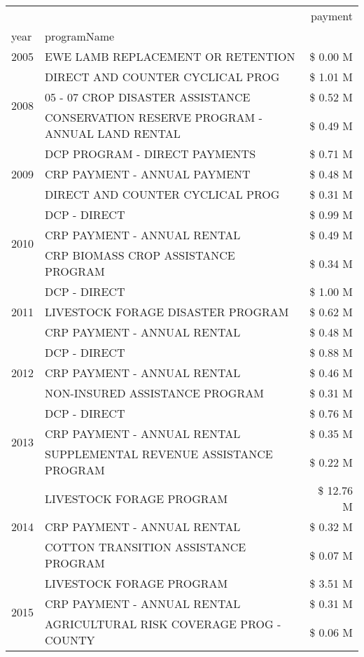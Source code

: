 \begin{tabular}{llr}
\toprule
 &  & payment \\
year & programName &  \\
\midrule
2005 & EWE LAMB REPLACEMENT OR RETENTION & \$ 0.00 M \\
\cline{1-3}
\multirow[t]{3}{*}{2008} & DIRECT AND COUNTER CYCLICAL PROG & \$ 1.01 M \\
 & 05 - 07 CROP DISASTER ASSISTANCE & \$ 0.52 M \\
 & CONSERVATION RESERVE PROGRAM - ANNUAL LAND RENTAL & \$ 0.49 M \\
\cline{1-3}
\multirow[t]{3}{*}{2009} & DCP PROGRAM - DIRECT PAYMENTS & \$ 0.71 M \\
 & CRP PAYMENT - ANNUAL PAYMENT & \$ 0.48 M \\
 & DIRECT AND COUNTER CYCLICAL PROG & \$ 0.31 M \\
\cline{1-3}
\multirow[t]{3}{*}{2010} & DCP - DIRECT & \$ 0.99 M \\
 & CRP PAYMENT - ANNUAL RENTAL & \$ 0.49 M \\
 & CRP BIOMASS CROP ASSISTANCE PROGRAM & \$ 0.34 M \\
\cline{1-3}
\multirow[t]{3}{*}{2011} & DCP - DIRECT & \$ 1.00 M \\
 & LIVESTOCK FORAGE DISASTER PROGRAM & \$ 0.62 M \\
 & CRP PAYMENT - ANNUAL RENTAL & \$ 0.48 M \\
\cline{1-3}
\multirow[t]{3}{*}{2012} & DCP - DIRECT & \$ 0.88 M \\
 & CRP PAYMENT - ANNUAL RENTAL & \$ 0.46 M \\
 & NON-INSURED ASSISTANCE PROGRAM & \$ 0.31 M \\
\cline{1-3}
\multirow[t]{3}{*}{2013} & DCP - DIRECT & \$ 0.76 M \\
 & CRP PAYMENT - ANNUAL RENTAL & \$ 0.35 M \\
 & SUPPLEMENTAL REVENUE ASSISTANCE PROGRAM & \$ 0.22 M \\
\cline{1-3}
\multirow[t]{3}{*}{2014} & LIVESTOCK FORAGE PROGRAM & \$ 12.76 M \\
 & CRP PAYMENT - ANNUAL RENTAL & \$ 0.32 M \\
 & COTTON TRANSITION ASSISTANCE PROGRAM & \$ 0.07 M \\
\cline{1-3}
\multirow[t]{3}{*}{2015} & LIVESTOCK FORAGE PROGRAM & \$ 3.51 M \\
 & CRP PAYMENT - ANNUAL RENTAL & \$ 0.31 M \\
 & AGRICULTURAL RISK COVERAGE PROG - COUNTY & \$ 0.06 M \\

\end{tabular}
